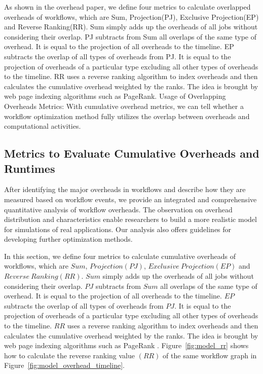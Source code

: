 As shown in the overhead paper, we define four metrics to calculate overlapped overheads of workflows, which are Sum, Projection(PJ), Exclusive Projection(EP) and Reverse Ranking(RR). Sum simply adds up the overheads of all jobs without considering their overlap. PJ subtracts from Sum all overlaps of the same type of overhead. It is equal to the projection of all overheads to the timeline. EP subtracts the overlap of all types of overheads from PJ. It is equal to the projection of overheads of a particular type excluding all other types of overheads to the timeline. RR uses a reverse ranking algorithm to index overheads and then calculates the cumulative overhead weighted by the ranks. The idea is brought by web page indexing algorithms such as PageRank.
Usage of Overlapping Overheads Metrics:
With cumulative overhead metrics, we can tell whether a workflow optimization method fully utilizes the overlap between overheads and computational activities. 



\subsection{Metrics to Evaluate Cumulative Overheads and Runtimes}

After identifying the major overheads in workflows and describe how they are measured based on workflow events, we provide an integrated and comprehensive quantitative analysis of workflow overheads. The observation on overhead distribution and characteristics enable researchers to build a more realistic model for simulations of real applications. Our analysis also offers guidelines for developing further optimization methods. 


In this section, we define four metrics to calculate cumulative overheads of workflows, which are $Sum$, $Projection(PJ)$, $Exclusive~Projection(EP)$ and $Reverse~Ranking(RR)$. $Sum$ simply adds up the overheads of all jobs without considering their overlap. $PJ$ subtracts from $Sum$ all overlaps of the same type of overhead. It is equal to the projection of all overheads to the timeline. $EP$ subtracts the overlap of all types of overheads from $PJ$. It is equal to the projection of overheads of a particular type excluding all other types of overheads to the timeline.
$RR$ uses a reverse ranking algorithm to index overheads and then calculates the cumulative overhead weighted by the ranks. The idea is brought by web page indexing algorithms such as PageRank \cite{PageRank1999}. Figure~\ref{fig:model_rr} shows how to calculate the reverse ranking value $(RR)$ of the same workflow graph in Figure~\ref{fig:model_overhead_timeline}.
 
